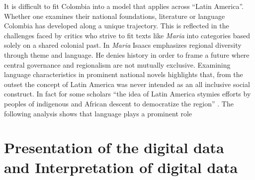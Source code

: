 \documentclass[12pt]{report}\usepackage[]{graphicx}\usepackage[]{color}
\begin{document}
\begin{spacing}{1.9}
It is difficult to fit Colombia into a model that applies across \enquote{Latin America}. Whether one examines their national foundations, literature or language Colombia has developed along a unique trajectory. This is reflected in the challenges faced by critics who strive to fit texts like \textit{Maria} into categories based solely on a shared colonial past. In \textit{Maria} Isaacs emphasizes regional diversity through theme and language. He denies history in order to frame a future where central governance and regionalism are not mutually exclusive. Examining language characteristics in prominent national novels highlights that, from the outset the concept of Latin America was never intended as an all inclusive social construct. In fact for some scholars \enquote{the idea of Latin America stymies efforts by peoples of indigenous and African descent to democratize the region} \autocite[1347]{Gobat2013}. The  following analysis shows that language plays a prominent role 



\section{Presentation of the digital data and Interpretation of digital data}



\end{spacing}
\end{document}
